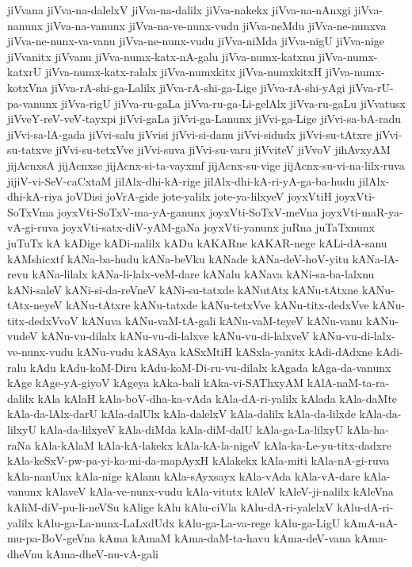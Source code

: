 {jiVvana
jiVva-na-dalelxV
jiVva-na-dalilx
jiVva-nakekx
jiVva-na-nAnxgi
jiVva-nanunx
jiVva-na-vanunx
jiVva-na-ve-nunx-vudu
jiVva-neMdu
jiVva-ne-nunxva
jiVva-ne-nunx-va-vanu
jiVva-ne-nunx-vudu
jiVva-niMda
jiVva-nigU
jiVva-nige
jiVvanitx
jiVvanu
jiVva-numx-katx-nA-galu
jiVva-numx-katxnu
jiVva-numx-katxrU
jiVva-numx-katx-ralalx
jiVva-numxkitx
jiVva-numxkitxH
jiVva-numx-kotxVna
jiVva-rA-shi-ga-Lalilx
jiVva-rA-shi-ga-Lige
jiVva-rA-shi-yAgi
jiVva-rU-pa-vanunx
jiVva-rigU
jiVva-ru-gaLa
jiVva-ru-ga-Li-gelAlx
jiVva-ru-gaLu
jiVvatusx
jiVveY-reV-veV-tayxpi
jiVvi-gaLa
jiVvi-ga-Lanunx
jiVvi-ga-Lige
jiVvi-sa-bA-radu
jiVvi-sa-lA-gada
jiVvi-salu
jiVvisi
jiVvi-si-danu
jiVvi-sidudx
jiVvi-su-tAtxre
jiVvi-su-tatxve
jiVvi-su-tetxVve
jiVvi-suva
jiVvi-su-varu
jiVviteV
jiVvoV
jihAvxyAM
jijAcnxsA
jijAcnxse
jijAcnx-si-ta-vayxmf
jijAcnx-su-vige
jijAcnx-su-vi-na-lilx-ruva
jijiV-vi-SeV-caCxtaM
jilAlx-dhi-kA-rige
jilAlx-dhi-kA-ri-yA-ga-ba-hudu
jilAlx-dhi-kA-riya
joVDisi
joVrA-gide
jote-yalilx
jote-ya-lilxyeV
joyxVtiH
joyxVti-SoTxVma
joyxVti-SoTxV-ma-yA-ganunx
joyxVti-SoTxV-meVna
joyxVti-maR-ya-vA-gi-ruva
joyxVti-satx-diV-yAM-gaNa
joyxVti-yanunx
juRna
juTaTxnunx
juTuTx
kA
kADige
kADi-nalilx
kADu
kAKARne
kAKAR-nege
kALi-dA-sanu
kAMshicxtf
kANa-ba-hudu
kANa-beVku
kANade
kANa-deV-hoV-yitu
kANa-lA-revu
kANa-lilalx
kANa-li-lalx-veM-dare
kANalu
kANava
kANi-sa-ba-lalxnu
kANi-saleV
kANi-si-da-reVneV
kANi-su-tatxde
kANutAtx
kANu-tAtxne
kANu-tAtx-neyeV
kANu-tAtxre
kANu-tatxde
kANu-tetxVve
kANu-titx-dedxVve
kANu-titx-dedxVvoV
kANuva
kANu-vaM-tA-gali
kANu-vaM-teyeV
kANu-vanu
kANu-vudeV
kANu-vu-dilalx
kANu-vu-di-lalxve
kANu-vu-di-lalxveV
kANu-vu-di-lalx-ve-nunx-vudu
kANu-vudu
kASAya
kASxMtiH
kASxla-yanitx
kAdi-dAdxne
kAdi-ralu
kAdu
kAdu-koM-Diru
kAdu-koM-Di-ru-vu-dilalx
kAgada
kAga-da-vanunx
kAge
kAge-yA-giyoV
kAgeya
kAka-bali
kAka-vi-SAThxyAM
kAlA-naM-ta-ra-dalilx
kAla
kAlaH
kAla-boV-dha-ka-vAda
kAla-dA-ri-yalilx
kAlada
kAla-daMte
kAla-da-lAlx-darU
kAla-dalUlx
kAla-dalelxV
kAla-dalilx
kAla-da-lilxde
kAla-da-lilxyU
kAla-da-lilxyeV
kAla-diMda
kAla-diM-dalU
kAla-ga-La-lilxyU
kAla-ha-raNa
kAla-kAlaM
kAla-kA-lakekx
kAla-kA-la-nigeV
kAla-ka-Le-yu-titx-dadxre
kAla-keSxV-pw-pa-yi-ka-mi-da-mapAyxH
kAlakekx
kAla-miti
kAla-nA-gi-ruva
kAla-nanUnx
kAla-nige
kAlanu
kAla-sAyxsayx
kAla-vAda
kAla-vA-dare
kAla-vanunx
kAlaveV
kAla-ve-nunx-vudu
kAla-vitutx
kAleV
kAleV-ji-nalilx
kAleVna
kAliM-diV-pu-li-neVSu
kAlige
kAlu
kAlu-ciVla
kAlu-dA-ri-yalelxV
kAlu-dA-ri-yalilx
kAlu-ga-La-nunx-LaLxdUdx
kAlu-ga-La-va-rege
kAlu-ga-LigU
kAmA-nA-mu-pa-BoV-geVna
kAma
kAmaM
kAma-daM-ta-havu
kAma-deV-vana
kAma-dheVnu
kAma-dheV-nu-vA-gali
}
